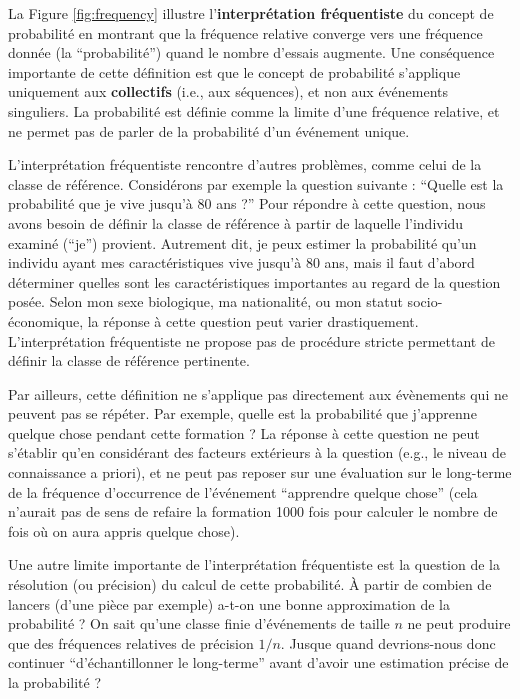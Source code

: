 \documentclass[
  a4paper,11pt,twoside,onecolumn,openright,final,oldfontcommands]{memoir}
\theoremstyle{definition}
\theoremstyle{definition}
\theoremstyle{definition}
\theoremstyle{remark}
\begin{document}
La Figure \ref{fig:frequency} illustre l'\textbf{interprétation fréquentiste} du concept de probabilité en montrant que la fréquence relative converge vers une fréquence donnée (la ``probabilité'') quand le nombre d'essais augmente. Une conséquence importante de cette définition est que le concept de probabilité s'applique uniquement aux \textbf{collectifs} (i.e., aux séquences), et non aux événements singuliers. La probabilité est définie comme la limite d'une fréquence relative, et ne permet pas de parler de la probabilité d'un événement unique.

L'interprétation fréquentiste rencontre d'autres problèmes, comme celui de la classe de référence. Considérons par exemple la question suivante : ``Quelle est la probabilité que je vive jusqu'à 80 ans ?'' Pour répondre à cette question, nous avons besoin de définir la classe de référence à partir de laquelle l'individu examiné (``je'') provient. Autrement dit, je peux estimer la probabilité qu'un individu ayant mes caractéristiques vive jusqu'à 80 ans, mais il faut d'abord déterminer quelles sont les caractéristiques importantes au regard de la question posée. Selon mon sexe biologique, ma nationalité, ou mon statut socio-économique, la réponse à cette question peut varier drastiquement. L'interprétation fréquentiste ne propose pas de procédure stricte permettant de définir la classe de référence pertinente.

Par ailleurs, cette définition ne s'applique pas directement aux évènements qui ne peuvent pas se répéter. Par exemple, quelle est la probabilité que j'apprenne quelque chose pendant cette formation ? La réponse à cette question ne peut s'établir qu'en considérant des facteurs extérieurs à la question (e.g., le niveau de connaissance a priori), et ne peut pas reposer sur une évaluation sur le long-terme de la fréquence d'occurrence de l'événement ``apprendre quelque chose'' (cela n'aurait pas de sens de refaire la formation 1000 fois pour calculer le nombre de fois où on aura appris quelque chose).

Une autre limite importante de l'interprétation fréquentiste est la question de la résolution (ou précision) du calcul de cette probabilité. À partir de combien de lancers (d'une pièce par exemple) a-t-on une bonne approximation de la probabilité ? On sait qu'une classe finie d'événements de taille \(n\) ne peut produire que des fréquences relatives de précision \(1/n\). Jusque quand devrions-nous donc continuer ``d'échantillonner le long-terme'' avant d'avoir une estimation précise de la probabilité ?
\end{document}
